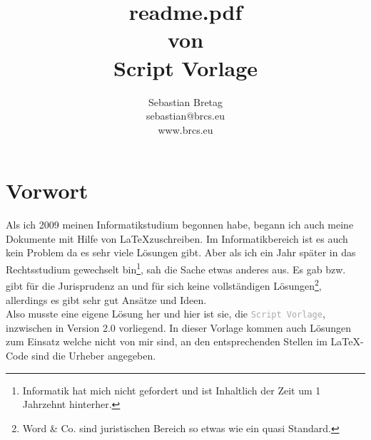 \documentclass[oneside, headings=small,headsepline,12pt, a4paper, numbers=noenddot, chapterprefix=false]{scrreprt}
\newcommand{\cmd}[1]{\textcolor{darkgrey}{{\small\texttt{{#1}}}}}
\begin{document}
\begingroup


\title{readme.pdf\\ von\\ Script Vorlage}

\author{Sebastian Bretag\\sebastian@brcs.eu\\www.brcs.eu}

\begin{titlepage}

\makeatletter
\noindent\@author\hfill\@date
\makeatother

\vspace{3cm}

\begin{center}

{%
\bfseries\hrulefill

\makeatletter
\Huge\@title
\makeatother


\hrulefill}

\end{center}
\end{titlepage}

\chapter*{Vorwort}
Als ich 2009 meinen Informatikstudium begonnen habe, begann ich auch meine Dokumente mit Hilfe von \LaTeX zuschreiben. Im Informatikbereich ist es auch kein Problem da es sehr viele Lösungen gibt. Aber als ich ein Jahr später in das Rechtsstudium gewechselt bin\footnote{Informatik hat mich nicht gefordert und ist Inhaltlich der Zeit um 1 Jahrzehnt hinterher.}, sah die Sache etwas anderes aus. Es gab bzw. gibt für die Jurisprudenz an und für sich keine vollständigen Lösungen\footnote{Word \& Co. sind juristischen Bereich so etwas wie ein quasi Standard.}, allerdings es gibt sehr gut Ansätze und Ideen.
\\

Also musste eine eigene Lösung her und hier ist sie, die \cmd{Script Vorlage}, inzwischen in Version 2.0 vorliegend. In dieser Vorlage kommen auch Lösungen zum Einsatz welche nicht von mir sind, an den entsprechenden Stellen im \LaTeX-Code sind die Urheber angegeben.
\\
\end{document}
